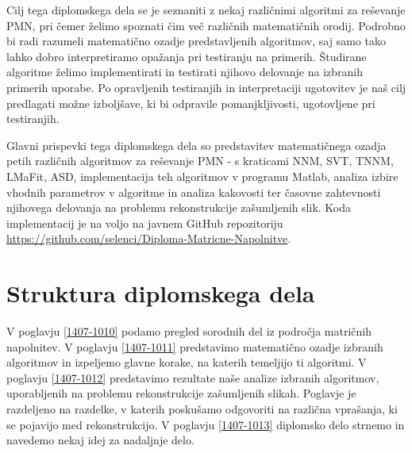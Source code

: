 Cilj tega 
diplomskega dela se je seznaniti z nekaj različnimi algoritmi
za reševanje PMN, pri čemer 
želimo spoznati čim več različnih matematičnih orodij.
Podrobno bi radi razumeli matematično ozadje predstavljenih algoritmov, saj samo tako lahko dobro interpretiramo opažanja pri testiranju na primerih.
Študirane algoritme želimo implementirati in testirati njihovo delovanje na izbranih primerih uporabe. Po opravljenih testiranjih in interpretaciji ugotovitev je naš cilj predlagati možne izboljšave, ki bi odpravile pomanjkljivosti, ugotovljene pri testiranjih. 

Glavni prispevki tega diplomskega dela so 
predstavitev matematičnega ozadja petih različnih algoritmov za reševanje PMN - s kraticami NNM, SVT, TNNM, LMaFit, ASD,
implementacija teh algoritmov v programu Matlab, analiza izbire vhodnih parametrov v algoritme in analiza kakovosti ter časovne zahtevnosti njihovega delovanja na  problemu rekonstrukcije zašumljenih slik. Koda implementacij je na voljo na javnem GitHub repozitoriju \url{https://github.com/selenci/Diploma-Matricne-Napolnitve}.

\iffalse
Cilj diplomske naloge je predstaviti uporabnost algoritmov, ter razložiti zakaj delujejo. Ideje različnih algoritmov ter njihove pristope do problema poskušamo kar se da jasno predstaviti in interpretirati.
\fi

\iffalse
Glavni prispevki te diplomske naloge so implementacija vseh omenjenih algoritmov, testiranje algoritmov na različnih primerih ter odgovori na vprašanja o uporabnosti metod, ki se nam med implementacijo porodijo. Podamo tudi vizualen prikaz rekonstruiranih slik, kot tudi grafičen prikaz napak in časov do konvergence programov.
\fi

\section{Struktura diplomskega dela}

V poglavju \ref{1407-1010} podamo pregled sorodnih del iz področja matričnih napolnitev. V poglavju \ref{1407-1011} predstavimo matematično ozadje izbranih algoritmov in izpeljemo glavne korake, na katerih temeljijo ti algoritmi. V poglavju \ref{1407-1012} predstavimo rezultate naše analize izbranih algoritmov, uporabljenih na problemu rekonstrukcije zašumljenih slikah. Poglavje je razdeljeno na razdelke, v katerih poskušamo odgovoriti na različna vprašanja, ki se pojavijo med rekonstrukcijo. V poglavju \ref{1407-1013} diplomsko delo strnemo in navedemo nekaj idej za nadaljnje delo.